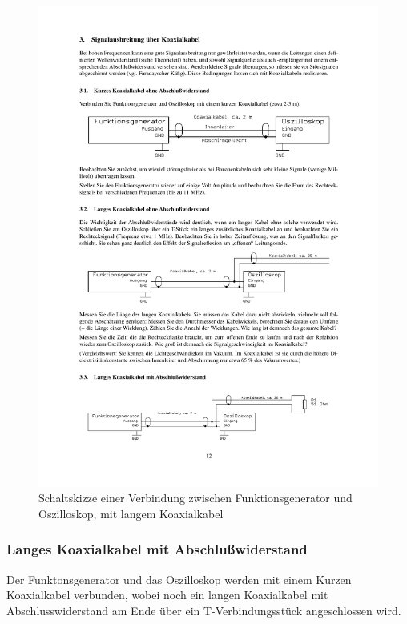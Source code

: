 \documentclass[12pt,a4paper]{article}
\begin{document}
\begin{figure}[H] 
  \centering
    \includegraphics[trim = 10mm 110mm 10mm 150mm, clip, scale = 1]{3-3_3.pdf}
  	\caption[Schaltskizze einer Verbindung zwischen Funktionsgenerator und Oszilloskop, mit langem Koaxialkabel]{Schaltskizze einer Verbindung zwischen Funktionsgenerator und Oszilloskop, mit langem Koaxialkabel\footnotemark}
  \label{fig:3.2}
\end{figure}

\subsubsection{Langes Koaxialkabel mit Abschlußwiderstand}

Der Funktonsgenerator und das Oszilloskop werden mit einem Kurzen Koaxialkabel verbunden, wobei noch ein langen Koaxialkabel mit Abschlusswiderstand am Ende über ein T-Verbindungsstück angeschlossen wird.
\end{document}
